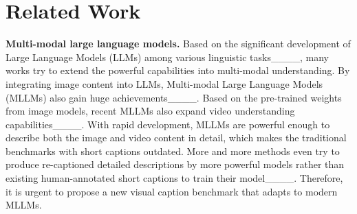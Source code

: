 \section{Related Work}
\noindent\textbf{Multi-modal large language models.}
Based on the significant development of Large Language Models (LLMs) among various linguistic tasks____, many works try to extend the powerful capabilities into multi-modal understanding. By integrating image content into LLMs, Multi-modal Large Language Models (MLLMs) also gain huge achievements____. Based on the pre-trained weights from image models, recent MLLMs also expand video understanding capabilities____. With rapid development, MLLMs are powerful enough to describe both the image and video content in detail, which makes the traditional benchmarks with short captions outdated. More and more methods even try to produce re-captioned detailed descriptions by more powerful models rather than existing human-annotated short captions to train their model____. Therefore, it is urgent to propose a new visual caption benchmark that adapts to modern MLLMs.

\begin{table}[!t]
\setlength\tabcolsep{3pt}
\centering
\caption{Comparison of our CAPability and other visual caption benchmarks in different aspects. We are the most comprehensive with both image and video data, multi-view annotations, and new thoroughness evaluation methods proposed.}
\label{tab:benchmark_comparison}
\end{table}


